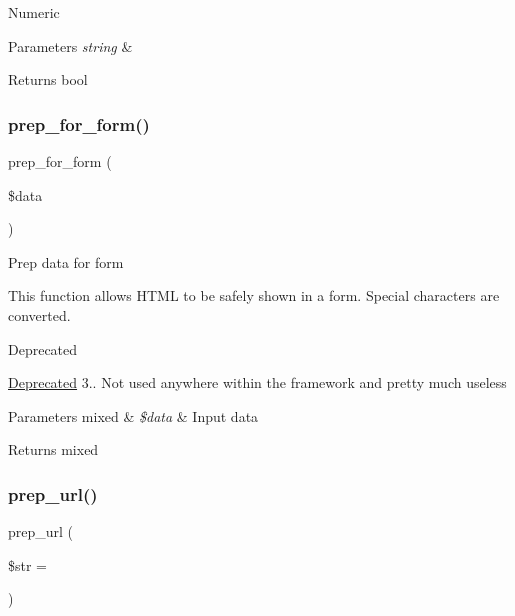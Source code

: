 Numeric


\begin{DoxyParams}{Parameters}
{\em string} & \\
\hline
\end{DoxyParams}
\begin{DoxyReturn}{Returns}
bool 
\end{DoxyReturn}
\mbox{\label{class_c_i___form__validation_a53938e0a994c9995de5c979ecb27bf1d}} 
\subsubsection{\texorpdfstring{prep\+\_\+for\+\_\+form()}{prep\_for\_form()}}
{\footnotesize\ttfamily prep\+\_\+for\+\_\+form (\begin{DoxyParamCaption}\item[{}]{\$data }\end{DoxyParamCaption})}

Prep data for form

This function allows H\+T\+ML to be safely shown in a form. Special characters are converted.

\begin{DoxyRefDesc}{Deprecated}
\item[\mbox{\hyperlink{deprecated__deprecated000019}{Deprecated}}]3.. Not used anywhere within the framework and pretty much useless \end{DoxyRefDesc}

\begin{DoxyParams}[1]{Parameters}
mixed & {\em \$data} & Input data \\
\hline
\end{DoxyParams}
\begin{DoxyReturn}{Returns}
mixed 
\end{DoxyReturn}
\mbox{\label{class_c_i___form__validation_a1218a70d68fe797013a53b3c7cd41d2f}} 
\subsubsection{\texorpdfstring{prep\+\_\+url()}{prep\_url()}}
{\footnotesize\ttfamily prep\+\_\+url (\begin{DoxyParamCaption}\item[{}]{\$str = {\ttfamily \textquotesingle{}\textquotesingle{}} }\end{DoxyParamCaption})}


